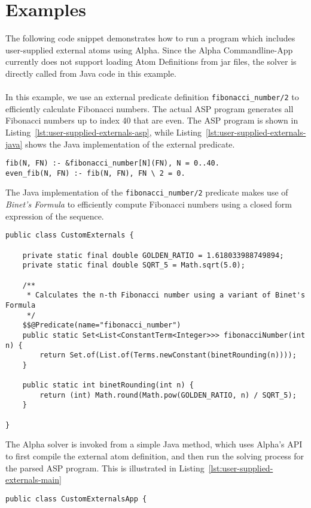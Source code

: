 \section{Examples}
\begin{example}
\label{ex:user-supplied-externals}
The following code snippet demonstrates how to run a program which includes user-supplied external atoms using Alpha. Since the Alpha Commandline-App currently does not support loading Atom Definitions from jar files, the solver is directly called from Java code in this example.\\
\\
In this example, we use an external predicate definition \texttt{fibonacci\_number/2} to efficiently calculate Fibonacci numbers. The actual ASP program generates all Fibonacci numbers up to index 40 that are even. The ASP program is shown in Listing~\ref{lst:user-supplied-externals-asp}, while Listing~\ref{lst:user-supplied-externals-java} shows the Java implementation of the external predicate.
\begin{lstlisting}[style=asp-code, label={lst:user-supplied-externals-asp}, caption={ASP program to find even Fibonacci numbers.}]
%% Find even fibonacci numbers up to F(40).
fib(N, FN) :- &fibonacci_number[N](FN), N = 0..40.
even_fib(N, FN) :- fib(N, FN), FN \ 2 = 0.    
\end{lstlisting}    
The Java implementation of the \texttt{fibonacci\_number/2} predicate makes use of \emph{Binet's Formula} to efficiently compute Fibonacci numbers using a closed form expression of the sequence.
\begin{lstlisting}[style=java, label={lst:user-supplied-externals-java}, caption={Fibonacci number computation in Java.}]
public class CustomExternals {

	private static final double GOLDEN_RATIO = 1.618033988749894;
	private static final double SQRT_5 = Math.sqrt(5.0);

	/**
	 * Calculates the n-th Fibonacci number using a variant of Binet's Formula
	 */
	$$@Predicate(name="fibonacci_number")
	public static Set<List<ConstantTerm<Integer>>> fibonacciNumber(int n) {
		return Set.of(List.of(Terms.newConstant(binetRounding(n))));
	}

	public static int binetRounding(int n) {
		return (int) Math.round(Math.pow(GOLDEN_RATIO, n) / SQRT_5);
	}

}    
\end{lstlisting}    
The Alpha solver is invoked from a simple Java method, which uses Alpha's API to first compile the external atom definition, and then run the solving process for the parsed ASP program. This is illustrated in Listing~\ref{lst:user-supplied-externals-main}
\begin{lstlisting}[style=java, label={lst:user-supplied-externals-main}]
public class CustomExternalsApp {


\end{lstlisting}
\end{example}
